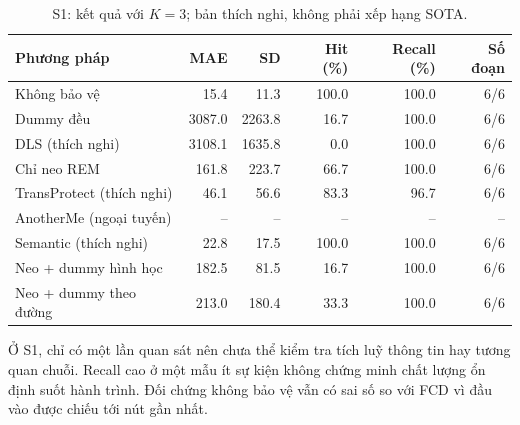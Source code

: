 \begin{table}[H]\centering\small

\setlength{\tabcolsep}{4pt}

\caption{S1: kết quả với $K=3$; bản thích nghi, không phải xếp hạng SOTA.}

\begin{tabular}{p{5.0cm}rrrrr}\toprule

Phương pháp & MAE & SD & Hit (\%) & Recall (\%) & Số đoạn\\\midrule

Không bảo vệ & 15.4 & 11.3 & 100.0 & 100.0 & 6/6\\

Dummy đều & 3087.0 & 2263.8 & 16.7 & 100.0 & 6/6\\

DLS (thích nghi) & 3108.1 & 1635.8 & 0.0 & 100.0 & 6/6\\

Chỉ neo REM & 161.8 & 223.7 & 66.7 & 100.0 & 6/6\\

TransProtect (thích nghi) & 46.1 & 56.6 & 83.3 & 96.7 & 6/6\\

AnotherMe (ngoại tuyến) & -- & -- & -- & -- & --\\

Semantic (thích nghi) & 22.8 & 17.5 & 100.0 & 100.0 & 6/6\\

Neo + dummy hình học & 182.5 & 81.5 & 16.7 & 100.0 & 6/6\\

Neo + dummy theo đường & 213.0 & 180.4 & 33.3 & 100.0 & 6/6\\

\bottomrule\end{tabular}\end{table}

Ở S1, chỉ có một lần quan sát nên chưa thể kiểm tra tích luỹ thông tin hay tương quan chuỗi. Recall cao ở một mẫu ít sự kiện không chứng minh chất lượng ổn định suốt hành trình. Đối chứng không bảo vệ vẫn có sai số so với FCD vì đầu vào được chiếu tới nút gần nhất.

